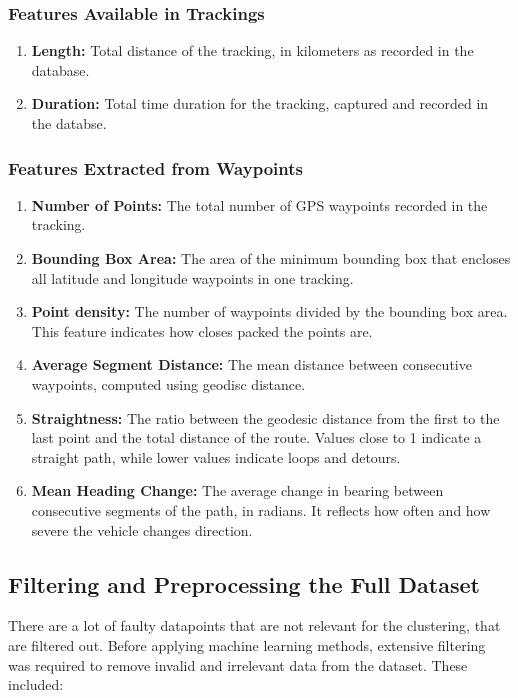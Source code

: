 \documentclass[a4paper,12pt,twoside]{scrreprt}
\begin{document}
\subsubsection{Features Available in Trackings}

\begin{enumerate}
  \item \textbf{Length:} Total distance of the tracking, in kilometers as
        recorded in the database.
  \item \textbf{Duration:} Total time duration for the tracking, captured and
        recorded in the databse.
\end{enumerate}

\subsubsection{Features Extracted from Waypoints}

\begin{enumerate}
  \item \textbf{Number of Points:} The total number of GPS waypoints recorded
        in the tracking.
  \item \textbf{Bounding Box Area:} The area of the minimum bounding box that
        encloses all latitude and longitude waypoints in one tracking.
  \item \textbf{Point density:} The number of waypoints divided by the bounding
        box area. This feature indicates how closes packed the points are.
  \item \textbf{Average Segment Distance:} The mean distance between
        consecutive waypoints, computed using geodisc distance.
  \item \textbf{Straightness:} The ratio between the geodesic distance from the
        first to the last point and the total distance of the route. Values
        close to 1
        indicate a straight path, while lower values indicate loops and
        detours.
  \item \textbf{Mean Heading Change:} The average change in bearing between
        consecutive segments of the path, in radians. It reflects how often and
        how
        severe the vehicle changes direction.
\end{enumerate}

\subsection{Filtering and Preprocessing the Full Dataset}
There are a lot of faulty datapoints that are not relevant for the
clustering, that are filtered out. Before applying machine learning methods,
extensive filtering was required to
remove invalid and irrelevant data from the dataset. These included:
\end{document}
